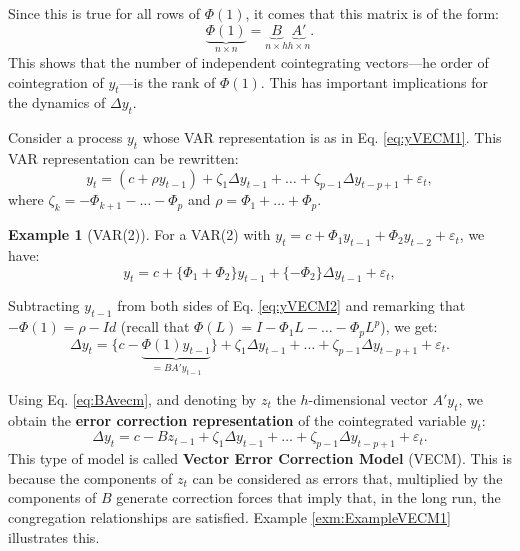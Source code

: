 \documentclass[
  11pt,
]{book}
\theoremstyle{definition}
\theoremstyle{definition}
\newtheorem{example}{Example}[chapter]
\theoremstyle{definition}
\theoremstyle{definition}
\theoremstyle{remark}
\begin{document}
Since this is true for all rows of \(\Phi(1)\), it comes that this matrix is of the form:
\begin{equation}
\underbrace{\Phi(1)}_{n\times n} = \underbrace{B}_{n\times h}\underbrace{A'}_{h\times n}.\label{eq:BAvecm}
\end{equation}
This shows that the number of independent cointegrating vectors---he order of cointegration of \(y_t\)---is the rank of \(\Phi(1)\). This has important implications for the dynamics of \(\Delta y_t\).

Consider a process \(y_t\) whose VAR representation is as in Eq. \eqref{eq:yVECM1}. This VAR representation can be rewritten:
\begin{equation}
y_t = (c + \rho y_{t-1}) + \zeta_1 \Delta y_{t-1} + \dots + \zeta_{p-1} \Delta y_{t-p+1} + \varepsilon_t,\label{eq:yVECM2}
\end{equation}
where \(\zeta_k = - \Phi_{k+1} - \dots - \Phi_{p}\) and \(\rho = \Phi_1 + \dots + \Phi_p\).

\begin{example}[VAR(2)]
\protect\hypertarget{exm:vecmVAR2}{}\label{exm:vecmVAR2}For a VAR(2) with \(y_t = c + \Phi_1 y_{t-1}+ \Phi_2 y_{t-2} + \varepsilon_t\), we have:
\[
y_t = c + \{\Phi_1 + \Phi_2\} y_{t-1} + \{-\Phi_2\} \Delta y_{t-1} + \varepsilon_t,
\]
\end{example}

Subtracting \(y_{t-1}\) from both sides of Eq. \eqref{eq:yVECM2} and remarking that \(-\Phi(1) = \rho - Id\) (recall that \(\Phi(L) = I - \Phi_1 L - \dots - \Phi_p L^p\)), we get:
\[
\Delta y_t = \{c - \underbrace{\Phi(1) y_{t-1}}_{=BA'y_{t-1}}\} + \zeta_1 \Delta y_{t-1} + \dots + \zeta_{p-1} \Delta y_{t-p+1} + \varepsilon_t.
\]

Using Eq. \eqref{eq:BAvecm}, and denoting by \(z_t\) the \(h\)-dimensional vector \(A'y_{t}\), we obtain the \textbf{error correction representation} of the cointegrated variable \(y_t\):
\begin{equation}
\boxed{\Delta y_t = c - B z_{t-1} + \zeta_1 \Delta y_{t-1} + \dots + \zeta_{p-1} \Delta y_{t-p+1} + \varepsilon_t.}\label{eq:VECM3}
\end{equation}
This type of model is called \textbf{Vector Error Correction Model} (VECM). This is because the components of \(z_t\) can be considered as errors that, multiplied by the components of \(B\) generate correction forces that imply that, in the long run, the congregation relationships are satisfied. Example \ref{exm:ExampleVECM1} illustrates this.
\end{document}
